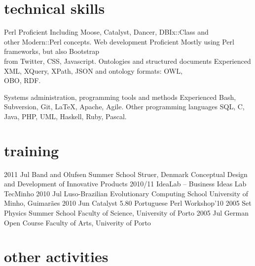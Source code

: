 \documentclass[a4paper]{friggeri-cv}
\begin{document}
\section{technical skills}
\begin{entrylist}
	\entry
		{}
		{Perl}
		{Proficient}
		{Including Moose, Catalyst, Dancer, DBIx::Class and\\
		other Modern::Perl concepts.}
	\entry
		{}
		{Web development}
		{Proficient}
		{Mostly using Perl frameworks, but also Bootstrap\\
		from Twitter, CSS, Javascript.}
	\entry
		{}
		{Ontologies and structured documents}
		{Experienced}
		{XML, XQuery, XPath, JSON and ontology formats: OWL,\\
		OBO, RDF.}
\end{entrylist}
\begin{entrylist}
	\entry
		{}
		{Systems administration, programming tools and methods}
		{Experienced}
		{Bash, Subversion, Git, \LaTeX, Apache, Agile.}
	\entry
		{}
		{Other programming languages}
		{}
		{SQL, C, Java, PHP, UML, Haskell, Ruby, Pascal.}
\end{entrylist}

\section{training}
\begin{entrylist}
	\entry
		{2011 {\footnotesize Jul}}
		{Band and Olufsen Summer School}
		{Struer, Denmark}
		{Conceptual Design and Development of Innovative Products}
	\entry
		{2010/11}
		{IdeaLab -- Business Ideas Lab}
		{TecMinho}
		{\vspace{-0.8cm}}
	\entry
		{2010 {\footnotesize Jul}}
		{Luso-Brazilian Evolutionary Computing School}
		{University of Minho, Guimarães}
		{\vspace{-0.8cm}}
	\entry
		{2010 {\footnotesize Jun}}
		{Catalyst 5.80}
		{Portuguese Perl Workshop'10}
		{\vspace{-0.8cm}}
	\entry
		{2005 {\footnotesize Set}}
		{Physics Summer School}
		{Faculty of Science, University of Porto}
		{\vspace{-0.8cm}}
	\entry
		{2005 {\footnotesize Jul}}
		{German Open Course}
		{Faculty of Arts, Univerity of Porto}
		{\vspace{-0.8cm}}
\end{entrylist}


\section{other activities}
\end{document}
